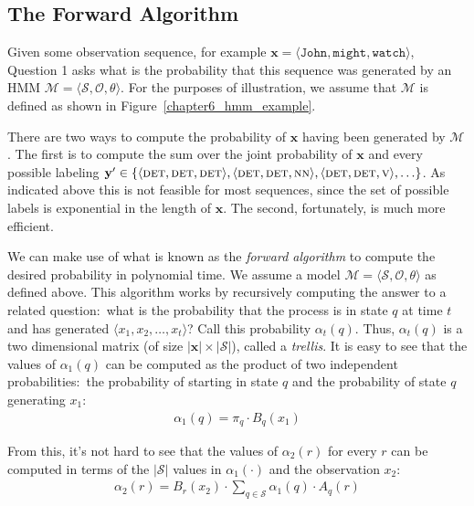\subsection{The Forward Algorithm}
\label{chapter6_forward}

Given some observation sequence, for example $\textbf{x} = \langle
\texttt{John}, \texttt{might}, \texttt{watch} \rangle$, Question 1 asks
what is the probability that this sequence was generated by an HMM
$\mathcal{M} = \langle \mathcal{S}, \mathcal{O}, \theta \rangle$.  For
the purposes of illustration, we assume that $\mathcal{M}$ is defined
as shown in Figure~\ref{chapter6_hmm_example}.

There are two ways to compute the probability of $\textbf{x}$ having
been generated by $\mathcal{M}$.  The first is to compute the sum over
the joint probability of $\textbf{x}$ and every possible labeling
$\textbf{y}' \in \{ \langle \textsc{det} , \textsc{det}, \textsc{det}
\rangle, \langle \textsc{det} , \textsc{det}, \textsc{nn} \rangle,
\langle \textsc{det} , \textsc{det}, \textsc{v} \rangle , \ldots \}$.
As indicated above this is not feasible for most sequences, since the
set of possible labels is exponential in the length of $\textbf{x}$.
The second, fortunately, is much more efficient.

We can make use of what is known as the \emph{forward algorithm} to
compute the desired probability in polynomial time.  We assume a model
$\mathcal{M} = \langle \mathcal{S}, \mathcal{O}, \theta \rangle$ as
defined above.  This algorithm works by recursively computing the
answer to a related question:\ what is the probability that the
process is in state $q$ at time $t$ and has generated $\langle x_1,
x_2, \ldots , x_t \rangle$?  Call this probability $\alpha_t(q)$.
Thus, $\alpha_t(q)$ is a two dimensional matrix (of size $|\textbf{x}|
\times |\mathcal{S}|$), called a \emph{trellis}.  It is easy to see
that the values of $\alpha_1(q)$ can be computed as the product of two
independent probabilities:\ the probability of starting in state $q$
and the probability of state $q$ generating $x_1$:
\begin{eqnarray}
\alpha_1(q) = \pi_q \cdot B_q(x_1)
\end{eqnarray}

\noindent From this, it's not hard to see that the values of
$\alpha_2(r)$ for every $r$ can be computed in terms of the
$|\mathcal{S}|$ values in $\alpha_1(\cdot)$ and the observation $x_2$:
\begin{eqnarray}
\alpha_2(r) =  B_r(x_2) \cdot \sum_{q \in \mathcal{S}} \alpha_1(q) \cdot A_q(r)
\end{eqnarray}

